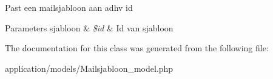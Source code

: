 Past een mailsjabloon aan adhv id 
\begin{DoxyParams}[1]{Parameters}
sjabloon & {\em \$id} & Id van sjabloon \\
\hline
\end{DoxyParams}


The documentation for this class was generated from the following file\+:\begin{DoxyCompactItemize}
\item 
application/models/Mailsjabloon\+\_\+model.\+php\end{DoxyCompactItemize}
